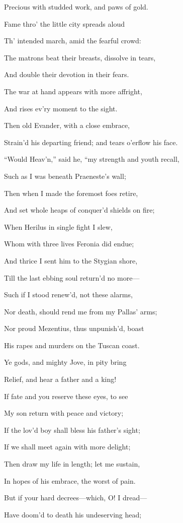 Precious with studded work, and paws of gold.

Fame thro’ the little city spreads aloud

Th’ intended march, amid the fearful crowd:

The matrons beat their breasts, dissolve in tears,

And double their devotion in their fears.

The war at hand appears with more affright,

And rises ev’ry moment to the sight.

Then old Evander, with a close embrace,

Strain’d his departing friend; and tears o’erflow his face.

“Would Heav’n,” said he, “my strength and youth recall,

Such as I was beneath Praeneste’s wall;

Then when I made the foremost foes retire,

And set whole heaps of conquer’d shields on fire;

When Herilus in single fight I slew,

Whom with three lives Feronia did endue;

And thrice I sent him to the Stygian shore,

Till the last ebbing soul return’d no more—

Such if I stood renew’d, not these alarms,

Nor death, should rend me from my Pallas’ arms;

Nor proud Mezentius, thus unpunish’d, boast

His rapes and murders on the Tuscan coast.

Ye gods, and mighty Jove, in pity bring

Relief, and hear a father and a king!

If fate and you reserve these eyes, to see

My son return with peace and victory;

If the lov’d boy shall bless his father’s sight;

If we shall meet again with more delight;

Then draw my life in length; let me sustain,

In hopes of his embrace, the worst of pain.

But if your hard decrees—which, O! I dread—

Have doom’d to death his undeserving head;

